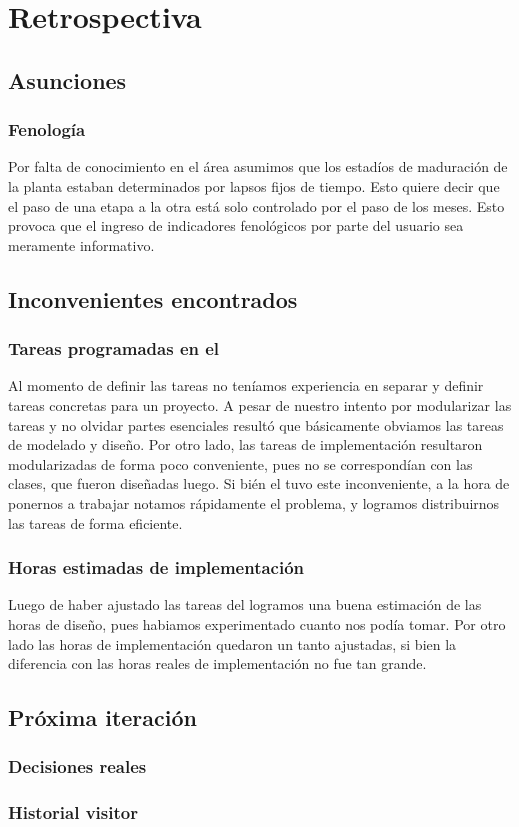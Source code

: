 \section{Retrospectiva}

  \subsection{Asunciones}
    \subsubsection{Fenolog\'ia}
      Por falta de conocimiento en el \'area asumimos que los estad\'ios de maduraci\'on
      de la planta estaban determinados por lapsos fijos de tiempo. Esto quiere decir que
      el paso de una etapa a la otra est\'a solo controlado por el paso de los meses. 
      Esto provoca que el ingreso de indicadores fenol\'ogicos por parte del usuario
      sea meramente informativo.  

  \subsection{Inconvenientes encontrados}
    \subsubsection{Tareas programadas en el \sprintback{}}
      Al momento de definir las tareas no ten\'iamos experiencia en separar y definir
      tareas concretas para un proyecto. A pesar de nuestro intento por modularizar
      las tareas y no olvidar partes esenciales result\'o que b\'asicamente obviamos
      las tareas de modelado y dise\~no. Por otro lado, las tareas de implementaci\'on
      resultaron modularizadas de forma poco conveniente, pues no se correspond\'ian
      con las clases, que fueron dise\~nadas luego. Si bi\'en el \sprintback{} tuvo
      este inconveniente, a la hora de ponernos a trabajar notamos r\'apidamente
      el problema, y logramos distribuirnos las tareas de forma eficiente.
    \subsubsection{Horas estimadas de implementaci\'on}
      Luego de haber ajustado las tareas del \sprintback{} logramos una buena
      estimaci\'on de las horas de dise\~no, pues habiamos experimentado cuanto
      nos pod\'ia tomar. Por otro lado las horas de implementaci\'on quedaron un tanto
      ajustadas, si bien la diferencia con las horas reales de implementaci\'on no
      fue tan grande.

    \subsection{Pr\'oxima iteraci\'on}

      \subsubsection{Decisiones reales}

      \subsubsection{Historial visitor}

